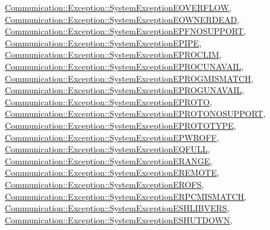\hyperlink{class_communication_1_1_exception_1_1_system_exception_e_o_v_e_r_f_l_o_w}{Communication\+::\+Exception\+::\+System\+Exception\+E\+O\+V\+E\+R\+F\+L\+O\+W}, \hyperlink{class_communication_1_1_exception_1_1_system_exception_e_o_w_n_e_r_d_e_a_d}{Communication\+::\+Exception\+::\+System\+Exception\+E\+O\+W\+N\+E\+R\+D\+E\+A\+D}, \hyperlink{class_communication_1_1_exception_1_1_system_exception_e_p_f_n_o_s_u_p_p_o_r_t}{Communication\+::\+Exception\+::\+System\+Exception\+E\+P\+F\+N\+O\+S\+U\+P\+P\+O\+R\+T}, \hyperlink{class_communication_1_1_exception_1_1_system_exception_e_p_i_p_e}{Communication\+::\+Exception\+::\+System\+Exception\+E\+P\+I\+P\+E}, \hyperlink{class_communication_1_1_exception_1_1_system_exception_e_p_r_o_c_l_i_m}{Communication\+::\+Exception\+::\+System\+Exception\+E\+P\+R\+O\+C\+L\+I\+M}, \hyperlink{class_communication_1_1_exception_1_1_system_exception_e_p_r_o_c_u_n_a_v_a_i_l}{Communication\+::\+Exception\+::\+System\+Exception\+E\+P\+R\+O\+C\+U\+N\+A\+V\+A\+I\+L}, \hyperlink{class_communication_1_1_exception_1_1_system_exception_e_p_r_o_g_m_i_s_m_a_t_c_h}{Communication\+::\+Exception\+::\+System\+Exception\+E\+P\+R\+O\+G\+M\+I\+S\+M\+A\+T\+C\+H}, \hyperlink{class_communication_1_1_exception_1_1_system_exception_e_p_r_o_g_u_n_a_v_a_i_l}{Communication\+::\+Exception\+::\+System\+Exception\+E\+P\+R\+O\+G\+U\+N\+A\+V\+A\+I\+L}, \hyperlink{class_communication_1_1_exception_1_1_system_exception_e_p_r_o_t_o}{Communication\+::\+Exception\+::\+System\+Exception\+E\+P\+R\+O\+T\+O}, \hyperlink{class_communication_1_1_exception_1_1_system_exception_e_p_r_o_t_o_n_o_s_u_p_p_o_r_t}{Communication\+::\+Exception\+::\+System\+Exception\+E\+P\+R\+O\+T\+O\+N\+O\+S\+U\+P\+P\+O\+R\+T}, \hyperlink{class_communication_1_1_exception_1_1_system_exception_e_p_r_o_t_o_t_y_p_e}{Communication\+::\+Exception\+::\+System\+Exception\+E\+P\+R\+O\+T\+O\+T\+Y\+P\+E}, \hyperlink{class_communication_1_1_exception_1_1_system_exception_e_p_w_r_o_f_f}{Communication\+::\+Exception\+::\+System\+Exception\+E\+P\+W\+R\+O\+F\+F}, \hyperlink{class_communication_1_1_exception_1_1_system_exception_e_q_f_u_l_l}{Communication\+::\+Exception\+::\+System\+Exception\+E\+Q\+F\+U\+L\+L}, \hyperlink{class_communication_1_1_exception_1_1_system_exception_e_r_a_n_g_e}{Communication\+::\+Exception\+::\+System\+Exception\+E\+R\+A\+N\+G\+E}, \hyperlink{class_communication_1_1_exception_1_1_system_exception_e_r_e_m_o_t_e}{Communication\+::\+Exception\+::\+System\+Exception\+E\+R\+E\+M\+O\+T\+E}, \hyperlink{class_communication_1_1_exception_1_1_system_exception_e_r_o_f_s}{Communication\+::\+Exception\+::\+System\+Exception\+E\+R\+O\+F\+S}, \hyperlink{class_communication_1_1_exception_1_1_system_exception_e_r_p_c_m_i_s_m_a_t_c_h}{Communication\+::\+Exception\+::\+System\+Exception\+E\+R\+P\+C\+M\+I\+S\+M\+A\+T\+C\+H}, \hyperlink{class_communication_1_1_exception_1_1_system_exception_e_s_h_l_i_b_v_e_r_s}{Communication\+::\+Exception\+::\+System\+Exception\+E\+S\+H\+L\+I\+B\+V\+E\+R\+S}, \hyperlink{class_communication_1_1_exception_1_1_system_exception_e_s_h_u_t_d_o_w_n}{Communication\+::\+Exception\+::\+System\+Exception\+E\+S\+H\+U\+T\+D\+O\+W\+N}, 